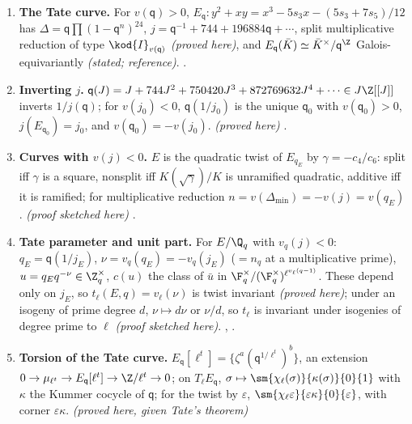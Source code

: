 \begin{enumerate}[label=\textbf{\thechapter.\arabic*}]
$\Frob\,\sigma\,\Frob^{-1}=\sigma^{-1}$ \emph{(proved here)} . Consequently (the paper link after it, with Lemma
lem:euler and the normalisation of $P_q$ in ) $P_2(X)=1+2X$ and $e_\ell(E,2)=v_\ell(3/2)$ \emph{(consequence; see
)}.
\item \textbf{The Tate curve.} For $v(\mathsf q)>0$, $E_{\mathsf q}\colon y^2+xy=x^3-5s_3x-(5s_3+7s_5)/12$ has $\Delta=\mathsf q\prod(1-\mathsf q^n)^{24}$,
$j=\mathsf q^{-1}+744+196884\mathsf q+\cdots$, split multiplicative reduction of type $\kod{I}_{v(\mathsf q)}$ \emph{(proved here)}, and
$E_{\mathsf q}(\bar K)\simeq\bar K^\times/\mathsf q^{\Z}$ Galois-equivariantly \emph{(stated; reference)}. .
\item \textbf{Inverting $j$.} $\mathsf q(J)=J+744J^2+750420J^3+872769632J^4+\cdots\in J\Z[[J]]$ inverts $1/j(\mathsf q)$; for $v(j_0)<0$, $\mathsf q(1/j_0)$
is the unique $\mathsf q_0$ with $v(\mathsf q_0)>0$, $j(E_{\mathsf q_0})=j_0$, and $v(\mathsf q_0)=-v(j_0)$. \emph{(proved here)}
.
\item \textbf{Curves with $v(j)<0$.} $E$ is the quadratic twist of $E_{q_E}$ by $\gamma=-c_4/c_6$: split iff $\gamma$ is a square, nonsplit iff
$K(\sqrt\gamma)/K$ is unramified quadratic, additive iff it is ramified; for multiplicative reduction $n=v(\Delta_{\min})=-v(j)=v(q_E)$.
\emph{(proof sketched here)} .
\item \textbf{Tate parameter and unit part.} For $E/\Q_q$ with $v_q(j)<0$: $q_E=\mathsf q(1/j_E)$, $\nu=v_q(q_E)=-v_q(j_E)$ ($=n_q$ at a multiplicative
prime), $u=q_Eq^{-\nu}\in\Z_q^\times$, $c(u)$ the class of $\bar u$ in $\F_q^\times/(\F_q^\times)^{\ell^{v_\ell(q-1)}}$. These depend only on $j_E$, so
$t_\ell(E,q)=v_\ell(\nu)$ is twist invariant \emph{(proved here)}; under an isogeny of prime degree $d$, $\nu\mapsto d\nu$ or $\nu/d$, so $t_\ell$ is
invariant under isogenies of degree prime to $\ell$ \emph{(proof sketched here)}. ,
.
\item \textbf{Torsion of the Tate curve.} $E_{\mathsf q}[\ell^t]=\{\zeta^a(\mathsf q^{1/\ell^t})^b\}$, an extension $0\to\mu_{\ell^t}\to E_{\mathsf q}[\ell^t]\to\Z/\ell^t\to0$;
on $T_\ell E_{\mathsf q}$, $\sigma\mapsto\sm{\chi_\ell(\sigma)}{\kappa(\sigma)}{0}{1}$ with $\kappa$ the Kummer cocycle of $\mathsf q$; for the twist by $\varepsilon$,
$\sm{\chi_\ell\varepsilon}{\varepsilon\kappa}{0}{\varepsilon}$, with corner $\varepsilon\kappa$. \emph{(proved here, given Tate's theorem)}

\end{enumerate}
